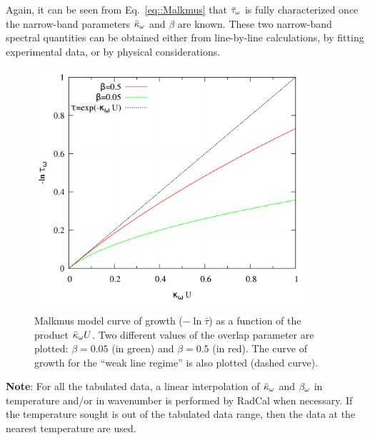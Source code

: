 Again, it can be seen from Eq.~\ref{eq::Malkmus} that $\bar{\tau}_{\omega}$ is fully characterized once the narrow-band parameters $\bar{\kappa}_{\omega}$ and $\beta$ are known. These two narrow-band spectral quantities can be obtained either from line-by-line calculations, by fitting experimental data, or by physical considerations.

\begin{figure}
\begin{center}
 \includegraphics[width=4.0in]{Figures/Malkmus_curve_of_growth.png}
\end{center}
 \caption{Malkmus model curve of growth ($-\ln \bar{\tau}$) as a function of the product $\bar{\kappa}_{\omega} U$. Two different values of the overlap parameter are plotted: $\beta = 0.05$ (in green) and $\beta = 0.5$ (in red). The curve of growth for the ``weak line regime'' is also plotted (dashed curve).\label{fig::Malkmus_curve_growth}}
\end{figure}

\textbf{Note}: For all the tabulated data, a linear interpolation of $\bar{\kappa}_{\omega}$ and $\beta_{\omega}$ in temperature and/or in wavenumber is performed by RadCal when necessary. If the temperature sought is out of the tabulated data range, then the data at the nearest temperature are used.

